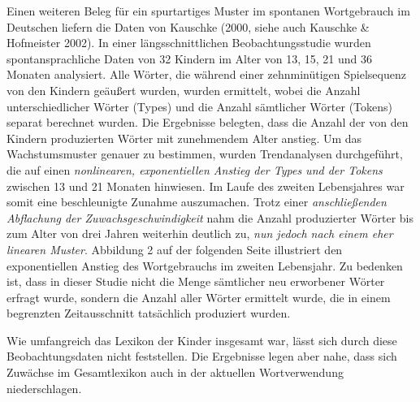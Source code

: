 \documentclass[
  letterpaper,
]{scrbook}
\begin{document}
\begin{tcolorbox}[enhanced jigsaw, breakable, colframe=quarto-callout-note-color-frame, bottomrule=.15mm, left=2mm, opacityback=0, colback=white, rightrule=.15mm, toprule=.15mm, leftrule=.75mm, arc=.35mm]
\begin{minipage}[t]{5.5mm}
\textcolor{quarto-callout-note-color}{\faInfo}
\end{minipage}%
\begin{minipage}[t]{\textwidth - 5.5mm}

Einen weiteren Beleg für ein spurtartiges Muster im spontanen
Wortgebrauch im Deutschen liefern die Daten von Kauschke (2000, siehe
auch Kauschke \& Hofmeister 2002). In einer längsschnittlichen
Beobachtungsstudie wurden spontansprachliche Daten von 32 Kindern im
Alter von 13, 15, 21 und 36 Monaten analysiert. Alle Wörter, die während
einer zehnminütigen Spielsequenz von den Kindern geäußert wurden, wurden
ermittelt, wobei die Anzahl unterschiedlicher Wörter (Types) und die
Anzahl sämtlicher Wörter (Tokens) separat berechnet wurden. Die
Ergebnisse belegten, dass die Anzahl der von den Kindern produzierten
Wörter mit zunehmendem Alter anstieg. Um das Wachstumsmuster genauer zu
bestimmen, wurden Trendanalysen durchgeführt, die auf einen
\emph{nonlinearen, exponentiellen Anstieg der Types und der Tokens}
zwischen 13 und 21 Monaten hinwiesen. Im Laufe des zweiten Lebensjahres
war somit eine beschleunigte Zunahme auszumachen. Trotz einer
\emph{anschließenden Abflachung der Zuwachsgeschwindigkeit} nahm die
Anzahl produzierter Wörter bis zum Alter von drei Jahren weiterhin
deutlich zu, \emph{nun jedoch nach einem eher linearen Muster}.
Abbildung 2 auf der folgenden Seite illustriert den exponentiellen
Anstieg des Wortgebrauchs im zweiten Lebensjahr. Zu bedenken ist, dass
in dieser Studie nicht die Menge sämtlicher neu erworbener Wörter
erfragt wurde, sondern die Anzahl aller Wörter ermittelt wurde, die in
einem begrenzten Zeitausschnitt tatsächlich produziert wurden.

Wie umfangreich das Lexikon der Kinder insgesamt war, lässt sich durch
diese Beobachtungsdaten nicht feststellen. Die Ergebnisse legen aber
nahe, dass sich Zuwächse im Gesamtlexikon auch in der aktuellen
Wortverwendung niederschlagen.

\end{minipage}%
\end{tcolorbox}
\end{document}

